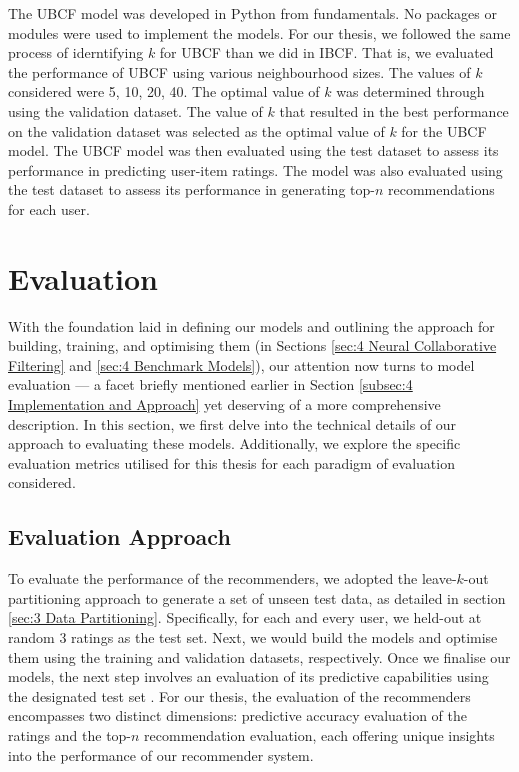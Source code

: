 The UBCF model was developed in Python from fundamentals. No packages or modules were used to implement the models. For our thesis, we followed the same process of iderntifying $k$ for UBCF than we did in IBCF. That is, we evaluated the performance of UBCF using various neighbourhood sizes. The values of $k$ considered were 5, 10, 20, 40. The optimal value of $k$ was determined through using the validation dataset. The value of $k$ that resulted in the best performance on the validation dataset was selected as the optimal value of $k$ for the UBCF model. The UBCF model was then evaluated using the test dataset to assess its performance in predicting user-item ratings. The model was also evaluated using the test dataset to assess its performance in generating top-$n$ recommendations for each user.





\section{Evaluation}
\label{sec:4 Evaluation}

With the foundation laid in defining our models and outlining the approach for building, training, and optimising them (in Sections \ref{sec:4 Neural Collaborative Filtering} and \ref{sec:4 Benchmark Models}), our attention now turns to model evaluation — a facet briefly mentioned earlier in Section \ref{subsec:4 Implementation and Approach} yet deserving of a more comprehensive description. In this section, we first delve into the technical details of our approach to evaluating these models. Additionally, we explore the specific evaluation metrics utilised for this thesis for each paradigm of evaluation considered. 


\subsection{Evaluation Approach}
\label{subsec:4 Evaluation Approach}

To evaluate the performance of the recommenders, we adopted the leave-$k$-out partitioning approach to generate a set of unseen test data, as detailed in section \ref{sec:3 Data Partitioning}. Specifically, for each and every user, we held-out at random 3 ratings as the test set. Next, we would build the models and optimise them using the training and validation datasets, respectively. Once we finalise our models, the next step involves an evaluation of its predictive capabilities using the designated test set \cite{hurley2011novelty}. For our thesis, the evaluation of the recommenders encompasses two distinct dimensions: predictive accuracy evaluation of the ratings and the top-$n$ recommendation evaluation, each offering unique insights into the performance of our recommender system.

